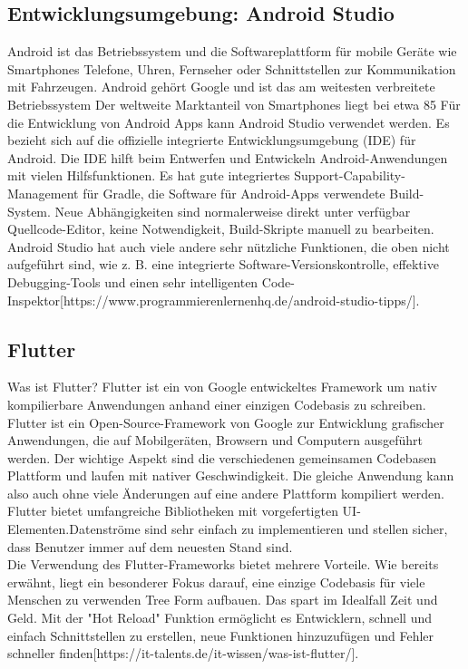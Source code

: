 \subsection{Entwicklungsumgebung: Android Studio}
Android ist das Betriebssystem und die Softwareplattform für mobile Geräte wie Smartphones
Telefone, Uhren, Fernseher oder Schnittstellen zur Kommunikation mit Fahrzeugen.
Android gehört Google und ist das am weitesten verbreitete Betriebssystem
Der weltweite Marktanteil von Smartphones liegt bei etwa 85 %
Für die Entwicklung von Android Apps kann Android Studio verwendet werden. 
Es bezieht sich auf die offizielle integrierte Entwicklungsumgebung (IDE) für Android. Die IDE hilft beim Entwerfen und Entwickeln Android-Anwendungen mit vielen Hilfsfunktionen. Es hat gute integriertes Support-Capability-Management für Gradle, die Software für Android-Apps verwendete Build-System. Neue Abhängigkeiten sind normalerweise direkt unter verfügbar Quellcode-Editor, keine Notwendigkeit, Build-Skripte manuell zu bearbeiten. 
Android Studio hat auch viele andere sehr nützliche Funktionen, die oben nicht aufgeführt sind, wie z. B. eine integrierte Software-Versionskontrolle, effektive Debugging-Tools und einen sehr intelligenten Code-Inspektor[https://www.programmierenlernenhq.de/android-studio-tipps/].
\subsection{Flutter}
Was ist Flutter? Flutter ist ein von Google entwickeltes Framework um nativ kompilierbare Anwendungen anhand einer einzigen Codebasis zu schreiben.
Flutter ist ein Open-Source-Framework von Google zur Entwicklung grafischer Anwendungen, die auf Mobilgeräten, Browsern und Computern ausgeführt werden. Der wichtige Aspekt sind die verschiedenen gemeinsamen Codebasen
Plattform und laufen mit nativer Geschwindigkeit. Die gleiche Anwendung kann also auch ohne viele Änderungen auf eine andere Plattform kompiliert werden. Flutter bietet umfangreiche Bibliotheken mit vorgefertigten UI-Elementen.Datenströme sind sehr einfach zu implementieren und stellen sicher, dass Benutzer immer auf dem neuesten Stand sind.\\
Die Verwendung des Flutter-Frameworks bietet mehrere Vorteile. Wie bereits erwähnt, liegt ein besonderer Fokus darauf, eine einzige Codebasis für viele Menschen zu verwenden Tree Form aufbauen. Das spart im Idealfall Zeit und Geld. Mit der "Hot Reload" Funktion ermöglicht es Entwicklern, schnell und einfach Schnittstellen zu erstellen, neue Funktionen hinzuzufügen und  
Fehler schneller finden[https://it-talents.de/it-wissen/was-ist-flutter/].
